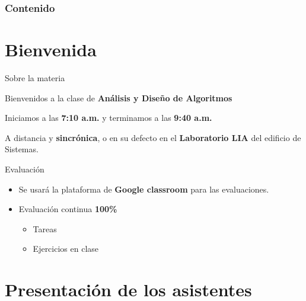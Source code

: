 \begin{frame}
    \frametitle{Contenido}
    \tableofcontents
\end{frame}

\section{Bienvenida}

\begin{frame}[c]{Sobre la materia}

  Bienvenidos a la clase de \textbf{Análisis y Diseño de Algoritmos}

  \vspace{\baselineskip}
  \begin{description}
    \pausa
    \item[Horario:] Iniciamos a las \textbf{7:10 a.m.} y terminamos a las
      \textbf{9:40 a.m.}
    \pausa
    \item[Modalidad:] A distancia y \textbf{sincrónica}, o en su defecto
      en el \textbf{Laboratorio LIA} del edificio de Sistemas.
  \end{description}
\end{frame}

\begin{frame}[c]{Evaluación}
  \begin{itemize}
    \item Se usará la plataforma de \textbf{Google classroom} para las
      evaluaciones.
    \pausa
    \item Evaluación continua \textbf{100\%}
    \pausa
    \begin{itemize}
      \item Tareas
      \pausa
      \item Ejercicios en clase
    \end{itemize}
  \end{itemize}
\end{frame}

\section{Presentación de los asistentes}

